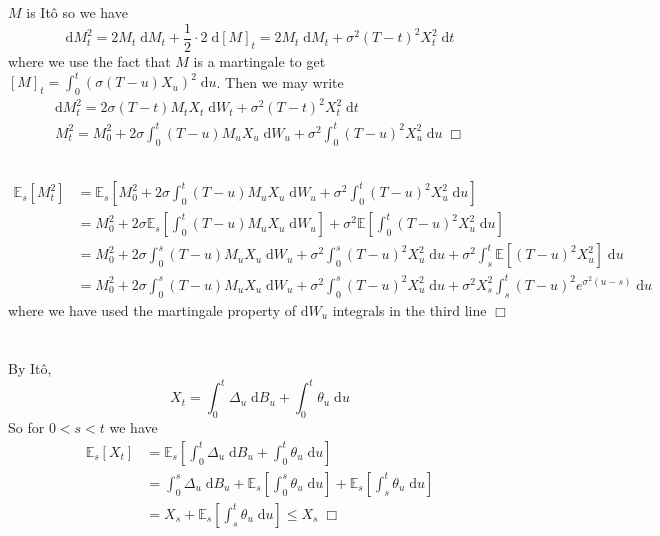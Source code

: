 \documentclass{article}
\begin{document}
\subsection{}
$M$ is It\^o so we have
$$\mathrm{d}M^2_t = 2M_t \;\mathrm{d}M_t + \frac{1}{2} \cdot 2 \;\mathrm{d}[M]_t = 2M_t \;\mathrm{d}M_t + \sigma^2(T-t)^2X_t^2 \;\mathrm{d}t$$
where we use the fact that $M$ is a martingale to get $[M]_t = \int_0^t \left( \sigma(T-u)X_u \right)^2 \;\mathrm{d}u$. Then we may write
\begin{gather*}
\mathrm{d}M^2_t = 2\sigma(T-t)M_tX_t \;\mathrm{d}W_t + \sigma^2(T-t)^2X_t^2 \;\mathrm{d}t\\
M_t^2 = M_0^2 + 2\sigma \int_0^t (T-u)M_uX_u \;\mathrm{d}W_u + \sigma^2 \int_0^t (T-u)^2X_u^2 \;\mathrm{d}u \; \Box
\end{gather*}


\subsection{}
\begin{equation*}
\begin{split}
\mathbb{E}_s[M_t^2] &= \mathbb{E}_s \left[ M_0^2 + 2\sigma \int_0^t (T-u)M_uX_u \;\mathrm{d}W_u + \sigma^2 \int_0^t (T-u)^2X_u^2 \;\mathrm{d}u \right]\\
&= M_0^2 + 2\sigma \mathbb{E}_s \left[ \int_0^t (T-u)M_uX_u \;\mathrm{d}W_u \right] + \sigma^2 \mathbb{E} \left[ \int_0^t (T-u)^2X_u^2 \;\mathrm{d}u \right]\\
&= M_0^2 + 2\sigma \int_0^s (T-u)M_uX_u \;\mathrm{d}W_u + \sigma^2\int_0^s (T-u)^2X_u^2 \;\mathrm{d}u + \sigma^2\int_s^t \mathbb{E} \left[ (T-u)^2X_u^2 \right] \;\mathrm{d}u\\
&= M_0^2 + 2\sigma \int_0^s (T-u)M_uX_u \;\mathrm{d}W_u + \sigma^2\int_0^s (T-u)^2X_u^2 \;\mathrm{d}u + \sigma^2X_s^2\int_s^t (T-u)^2 e^{\sigma^2(u-s)} \;\mathrm{d}u
\end{split}
\end{equation*}
where we have used the martingale property of $\mathrm{d}W_u$ integrals in the third line $\Box$

\section{}
By It\^o,
$$X_t = \int_0^t \Delta_u \;\mathrm{d}B_u + \int_0^t \theta_u \;\mathrm{d}u$$
So for $0 < s < t$ we have
\begin{equation*}
\begin{split}
\mathbb{E}_s[X_t] &= \mathbb{E}_s\left[ \int_0^t \Delta_u \;\mathrm{d}B_u + \int_0^t \theta_u \;\mathrm{d}u \right]\\
&= \int_0^s \Delta_u \;\mathrm{d}B_u + \mathbb{E}_s\left[ \int_0^s \theta_u \;\mathrm{d}u \right] + \mathbb{E}_s\left[ \int_s^t \theta_u \;\mathrm{d}u \right]\\
&= X_s + \mathbb{E}_s \left[ \int_s^t \theta_u \;\mathrm{d}u \right] \leq X_s \; \Box
\end{split}
\end{equation*}
\end{document}
